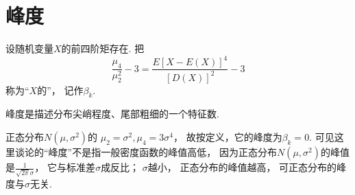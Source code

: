 \section{峰度}
\begin{definition}
设随机变量\(X\)的前四阶矩存在.
把\[
	\frac{\mu_4}{\mu_2^2}-3
	=\frac{E[X-E(X)]^4}{[D(X)]^2}-3
\]称为“\(X\)的”，
记作\(\beta_k\).
\end{definition}

峰度是描述分布尖峭程度、尾部粗细的一个特征数.

\begin{example}
正态分布\(N(\mu,\sigma^2)\)的
\(\mu_2=\sigma^2,
\mu_4=3\sigma^4\)，
故按定义，它的峰度为\(\beta_k=0\).
可见这里谈论的“峰度”不是指一般密度函数的峰值高低，
因为正态分布\(N(\mu,\sigma^2)\)的峰值是\(\frac1{\sqrt{2\pi}\sigma}\)，
它与标准差\(\sigma\)成反比；
\(\sigma\)越小，
正态分布的峰值越高，
可正态分布的峰度与\(\sigma\)无关.
\end{example}
